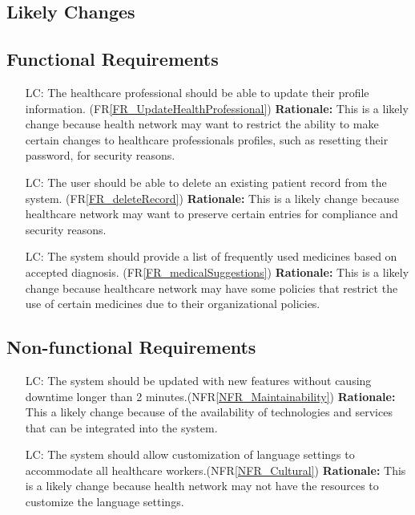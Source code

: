 \documentclass[12pt]{article}
\newcounter{lcnum} %
\begin{document}
\begin{itemize}
\section{Likely Changes}

\subsection{Functional Requirements}
\noindent \begin{itemize}
\item[LC\refstepcounter{lcnum}\thelcnum\label{LC_profileUpdate}:] The healthcare professional should be able to update their profile information. (FR\ref{FR_UpdateHealthProfessional})
\textbf{Rationale:} This is a likely change because health network may want to restrict the ability to make certain changes to healthcare professionals profiles, such as resetting their password, for security reasons.

\item[LC\refstepcounter{lcnum}\thelcnum\label{LC_patientDelete}:] The user should be able to delete an existing patient record from the system. (FR\ref{FR_deleteRecord})
\textbf{Rationale:} This is a likely change because healthcare network may want to preserve certain entries for compliance and security reasons.

\item[LC\refstepcounter{lcnum}\thelcnum\label{LC_addHealthNetwork}:] The system should provide a list of frequently used medicines based on accepted diagnosis. (FR\ref{FR_medicalSuggestions})
\textbf{Rationale:} This is a likely change because healthcare network may have some policies that restrict the use of certain medicines due to their organizational policies.
\end{itemize}


\subsection{Non-functional Requirements}
\noindent \begin{itemize}
  \item[LC\refstepcounter{lcnum}\thelcnum\label{LC_maintainability}:] The system should be updated with new features without causing downtime longer than 2 minutes.(NFR\ref{NFR_Maintainability})
  \textbf{Rationale:} This a likely change because of the availability of technologies and services that can be integrated into the system.

  \item[LC\refstepcounter{lcnum}\thelcnum\label{LC_cultural}:] The system should allow customization of language settings to accommodate all healthcare workers.(NFR\ref{NFR_Cultural})
  \textbf{Rationale:} This is a likely change because health network may not have the resources to customize the language settings.


\end{itemize}
\end{itemize}
\end{document}
